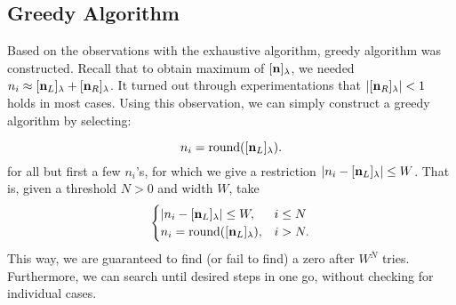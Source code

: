\documentclass{article}
\theoremstyle{definition}
\theoremstyle{plain}
\theoremstyle{remark}
\numberwithin{equation}{section}
\newcommand{\abs}[1]{\left\lvert{#1}\right\rvert}
\begin{document}
\newpage

\subsection{Greedy Algorithm}
Based on the observations with the exhaustive algorithm, greedy algorithm was constructed.
Recall that to obtain maximum of $[\mathbf{n}]_\lambda$, we needed $n_i \approx [\mathbf{n}_L]_\lambda + [\mathbf{n}_R]_\lambda$.
It turned out through experimentations that $\abs{[\nsR]_\lambda} < 1$ holds in most cases.
Using this observation, we can simply construct a greedy algorithm by selecting:

\[
  n_i = \operatorname{round} ([\mathbf{n}_L]_\lambda).
\]
for all but first a few $n_i$'s, for which we give a restriction $\abs{n_i - [\nsL]_\lambda} \leq W$.
That is, given a threshold $N > 0$ and width $W$, take
\[
  \begin{cases}
    \abs{n_i - [\nsL]_\lambda} \leq W, & i \leq N \\
    n_i = \operatorname{round} ([\nsL]_\lambda), & i > N. \\
  \end{cases}
\]
This way, we are guaranteed to find (or fail to find) a zero after $W^N$ tries.
Furthermore, we can search until desired steps in one go, without checking for individual cases.
\end{document}
